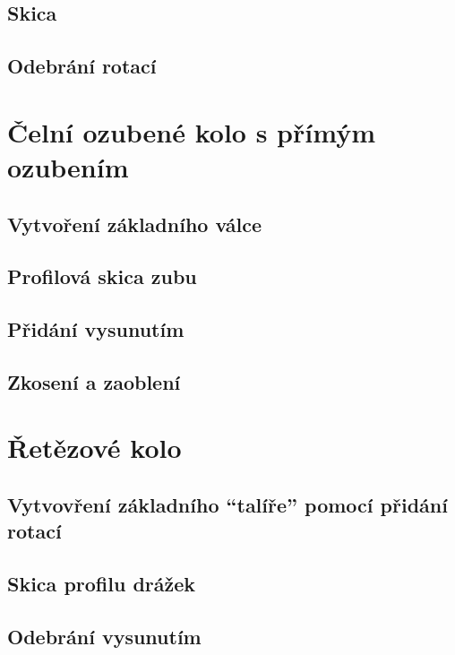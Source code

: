 \subsection*{Skica}

\subsection*{Odebrání rotací}

\section{Čelní ozubené kolo s přímým ozubením}

\subsection*{Vytvoření základního válce}

\subsection*{Profilová skica zubu}

\subsection*{Přidání vysunutím}

\subsection*{Zkosení a zaoblení}

\section{Řetězové kolo}

\subsection*{Vytvovření základního \enquote{talíře} pomocí přidání rotací}

\subsection*{Skica profilu drážek}

\subsection*{Odebrání vysunutím}

\newpage